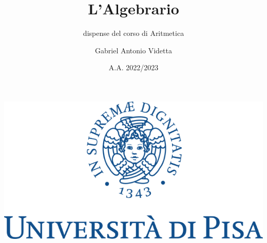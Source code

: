 \documentclass[11pt]{scrartcl}
\begin{document}
\title{L'Algebrario}
\subtitle{dispense del corso di Aritmetica}
\author{Gabriel Antonio Videtta}
\date{A.A. 2022/2023}
\maketitle
\thispagestyle{empty}

\begin{center}
	\includegraphics[scale=0.3]{logo.png}
\end{center}

\newpage
\thispagestyle{empty}
~\newpage



\newpage
\thispagestyle{empty}
~\newpage

\tableofcontents

\newpage
\thispagestyle{empty}
~\newpage



\newpage
\thispagestyle{empty}
~\newpage



\newpage
\thispagestyle{empty}
~\newpage



\newpage
\thispagestyle{empty}
~\newpage



\newpage
\thispagestyle{empty}
~\newpage



\newpage
\thispagestyle{empty}
~\newpage



\newpage
\thispagestyle{empty}
~\newpage
\end{document}
